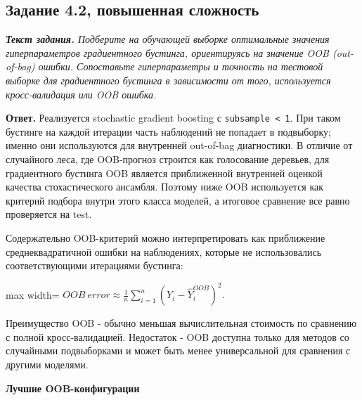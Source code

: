 \documentclass[11pt]{article}
\newenvironment{tasktext}
      {\begin{tcolorbox}[breakable, colback=black!3, colframe=black!28,
        boxrule=0.4pt, arc=1.5mm, left=7pt, right=7pt, top=5pt, bottom=5pt,
        before skip=0.35em, after skip=0.75em]\itshape}
      {\end{tcolorbox}}
\begin{document}
    \subsection{Задание 4.2, повышенная
сложность}\label{ux437ux430ux434ux430ux43dux438ux435-4.2-ux43fux43eux432ux44bux448ux435ux43dux43dux430ux44f-ux441ux43bux43eux436ux43dux43eux441ux442ux44c}

\begin{tasktext}
\textbf{Текст задания.} Подберите на обучающей выборке оптимальные
значения гиперпараметров градиентного бустинга, ориентируясь на значение
OOB (out-of-bag) ошибки. Сопоставьте гиперпараметры и точность на
тестовой выборке для градиентного бустинга в зависимости от того,
используется кросс-валидация или OOB ошибка.
\end{tasktext}

\textbf{Ответ.} Реализуется stochastic gradient boosting с
\texttt{subsample\ \textless{}\ 1}. При таком бустинге на каждой
итерации часть наблюдений не попадает в подвыборку; именно они
используются для внутренней out-of-bag диагностики. В отличие от
случайного леса, где OOB-прогноз строится как голосование деревьев, для
градиентного бустинга OOB является приближенной внутренней оценкой
качества стохастического ансамбля. Поэтому ниже OOB используется как
критерий подбора внутри этого класса моделей, а итоговое сравнение все
равно проверяется на test.

Содержательно OOB-критерий можно интерпретировать как приближение
среднеквадратичной ошибки на наблюдениях, которые не использовались
соответствующими итерациями бустинга:

\begin{center}
\begin{adjustbox}{max width=\linewidth}
\(\displaystyle OOB\ error \approx \frac{1}{n}\sum_{i=1}^{n}(Y_i - \hat Y_i^{OOB})^2.\)
\end{adjustbox}
\end{center}

Преимущество OOB - обычно меньшая вычислительная стоимость по сравнению
с полной кросс-валидацией. Недостаток - OOB доступна только для методов
со случайными подвыборками и может быть менее универсальной для
сравнения с другими моделями.

\textbf{Лучшие OOB-конфигурации}
\end{document}
